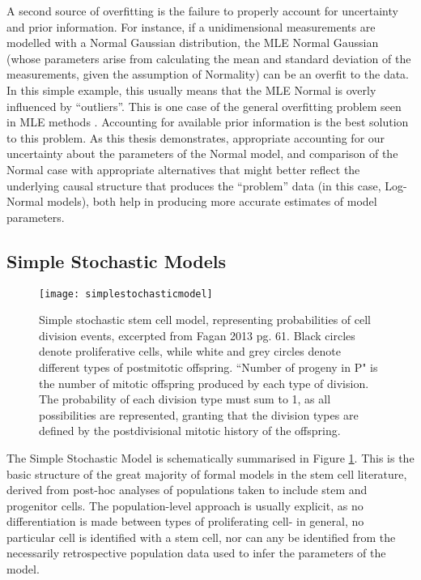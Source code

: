 A second source of overfitting is the failure to properly account for uncertainty and prior information. For instance, if a unidimensional measurements are modelled with a Normal Gaussian distribution, the MLE Normal Gaussian (whose parameters arise from calculating the mean and standard deviation of the measurements, given the assumption of Normality) can be an overfit to the data. In this simple example, this usually means that the MLE Normal is overly influenced by ``outliers''. This is one case of the general overfitting problem seen in MLE methods \cite{Green2017}. Accounting for available prior information is the best solution to this problem. As this thesis demonstrates, appropriate accounting for our uncertainty about the parameters of the Normal model, and comparison of the Normal case with appropriate alternatives that might better reflect the underlying causal structure that produces the ``problem'' data (in this case, Log-Normal models), both help in producing more accurate estimates of model parameters.
 
\subsection{Simple Stochastic Models}
\label{SSM}

\begin{figure}
\texttt{[image: simplestochasticmodel]}
\centering
\caption{Simple stochastic stem cell model, representing probabilities of cell division events, excerpted from Fagan 2013 pg. 61. Black circles denote proliferative cells, while white and grey circles denote different types of postmitotic offspring. ``Number of progeny in P" is the number of mitotic offspring produced by each type of division. The probability of each division type must sum to 1, as all possibilities are represented, granting that the division types are defined by the postdivisional mitotic history of the offspring.}
\label{fig:SSM}
\end{figure}

The Simple Stochastic Model is schematically summarised in Figure \ref{fig:SSM}. This is the basic structure of the great majority of formal models in the stem cell literature, derived from post-hoc analyses of populations taken to include stem and progenitor cells. The population-level approach is usually explicit, as no differentiation is made between types of proliferating cell- in general, no particular cell is identified with a stem cell, nor can any be identified from the necessarily retrospective population data used to infer the parameters of the model. 


